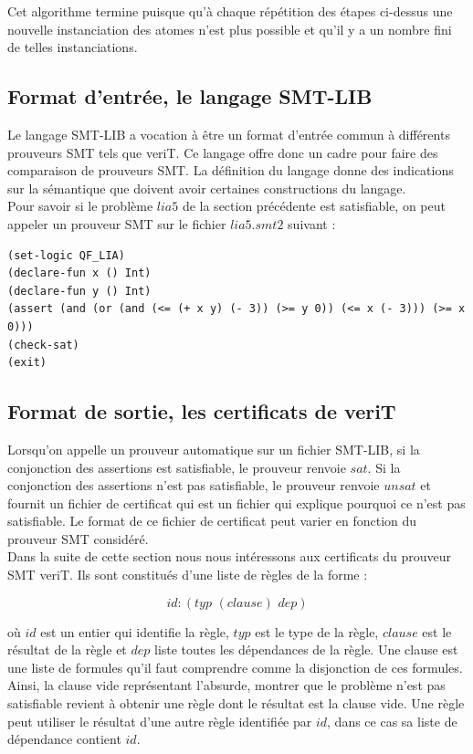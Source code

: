 \documentclass[11pt]{article}
\begin{document}
Cet algorithme termine puisque qu'à chaque répétition des étapes ci-dessus une nouvelle instanciation des atomes n'est plus possible et qu'il y a un nombre fini de telles instanciations. 

\subsection{Format d'entrée, le langage SMT-LIB} \label{smt-lib}

Le langage SMT-LIB a vocation à être un format d'entrée commun à différents prouveurs SMT tels que veriT. Ce langage offre donc un cadre pour faire des comparaison de prouveurs SMT. La définition du langage \cite{smtlib} donne des indications sur la sémantique que doivent avoir certaines constructions du langage.\\

Pour savoir si le problème $lia5$ de la section précédente est satisfiable, on peut appeler un prouveur SMT sur le fichier $lia5.smt2$ suivant :
\begin{lstlisting}[frame=single]
(set-logic QF_LIA)
(declare-fun x () Int)
(declare-fun y () Int)
(assert (and (or (and (<= (+ x y) (- 3)) (>= y 0)) (<= x (- 3))) (>= x 0)))
(check-sat)
(exit)
\end{lstlisting}

\subsection{Format de sortie, les certificats de veriT} \label{sortie}

Lorsqu'on appelle un prouveur automatique sur un fichier SMT-LIB, si la conjonction des assertions est satisfiable, le prouveur renvoie $sat$. Si la conjonction des assertions n'est pas satisfiable, le prouveur renvoie $unsat$ et fournit un fichier de certificat qui est un fichier qui explique pourquoi ce n'est pas satisfiable. Le format de ce fichier de certificat peut varier en fonction du prouveur SMT considéré. \\


Dans la suite de cette section nous nous intéressons aux certificats du prouveur SMT veriT. Ils sont constitués d'une liste de règles de la forme : 

\[id:(typ \,\, (clause) \,\, dep)\]

où $id$ est un entier qui identifie la règle, $typ$ est le type de la règle, $clause$ est le résultat de la règle et $dep$ liste toutes les dépendances de la règle. Une clause est une liste de formules qu'il faut comprendre comme la disjonction de ces formules. Ainsi, la clause vide représentant l'absurde, montrer que le problème n'est pas satisfiable revient à obtenir une règle dont le résultat est la clause vide. Une règle peut utiliser le résultat d'une autre règle identifiée par $id$, dans ce cas sa liste de dépendance contient $id$.
\end{document}
